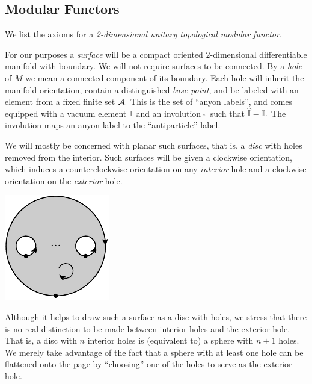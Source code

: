 \documentclass[aps, tightenlines, letterpaper, onecolumn, superscriptaddress, notitlepage, 11pt, groupedaddress]{revtex4-1}
\begin{document}
%
%

\subsection{Modular Functors}

We list the axioms for a 
\emph{2-dimensional unitary topological modular functor}.

For our purposes a \emph{surface} will be a compact
oriented $2$-dimensional differentiable manifold with boundary. %
We will not require surfaces to be connected.
By a \emph{hole} of $M$ we mean a connected component of its boundary. %
Each hole will inherit the manifold orientation,
contain a distinguished \emph{base point},
and be labeled with
an element from a fixed finite set $\mathcal{A}.$
This is the set of ``anyon labels'', and comes
equipped with a vacuum element $\mathbb{I}$ 
and an involution $\ \widehat{}\ $ such that $\widehat{\mathbb{I}}=\mathbb{I}.$
The involution maps an anyon label to the ``antiparticle'' label.

We will mostly be concerned with planar such
surfaces, that is, a \emph{disc} with holes removed from the
interior.
Such surfaces will be given a clockwise 
orientation, which induces a counterclockwise orientation on
any \emph{interior} hole and a clockwise orientation
on the \emph{exterior} hole.
\begin{center}
\includegraphics[]{pic-disc.pdf}
\end{center}
Although it helps to draw such a surface as a disc with holes,
we stress that there is no real distinction to be made between
interior holes and the exterior hole.
That is, 
a disc with $n$ interior holes is (equivalent to) a sphere with $n+1$ holes.
We merely take advantage of the fact that a sphere with at least one hole
can be flattened onto the page by ``choosing'' one of the holes to
serve as the exterior hole.
\end{document}
